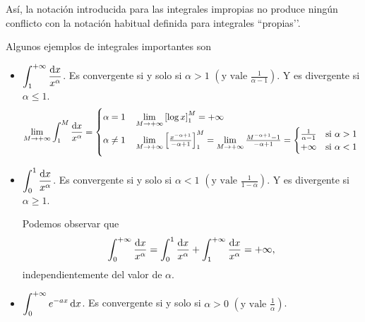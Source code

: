 \begin{obs}
    Así, la notación introducida para las integrales impropias no produce ningún
    conflicto con la notación habitual definida para integrales ``propias’’.
\end{obs}

\begin{example}
    Algunos ejemplos de integrales importantes son
    \begin{itemize}
        \item $\displaystyle \int^{+\infty}_1 \frac{\dif x}{x^\alpha}$. Es
            convergente si y solo si $\alpha > 1$ $\left(\text{y vale }
            \frac{1}{\alpha-1}\right)$. Y es divergente si $\alpha \leq 1$.
            \[
                \lim_{M \to +\infty} \int^M_1 \frac{\dif x}{x^\alpha} =
                \begin{cases}
                    \alpha = 1 \quad \lim\limits_{M \to +\infty}
                    \left[\log x \right]^M_1 = + \infty \\
                    \alpha \neq 1 \quad \lim\limits_{M \to +\infty}
                    \left[\frac{x^{-\alpha+1}}{-\alpha+1}
                    \right]^M_1 = \lim\limits_{M \to +\infty}
                    \frac{M^{-\alpha+1}-1}{-\alpha+1}=\begin{cases}
                        \frac{1}{\alpha-1} \quad
                        \text{si $\alpha > 1$} \\
                        +\infty \quad \text{si $\alpha < 1$}
                    \end{cases}
                \end{cases}
            \]
        \item $\displaystyle \int^1_0 \frac{\dif x}{x^\alpha}$. Es convergente
            si y solo si $\alpha < 1$ $\left(\text{y vale } \frac{1}{1-\alpha
            }\right)$. Y es divergente si $\alpha \geq 1$.

            Podemos observar que
            \[
                \int^{+\infty}_0 \frac{\dif x}{x^\alpha} = \int^1_0
                \frac{\dif x}{x^\alpha} + \int^{+\infty}_1
                \frac{\dif x}{x^\alpha} = +\infty,
            \]
            independientemente del valor de $\alpha$.
        \item $\displaystyle  \int^{+\infty}_0 e^{-ax} \dif x$. Es convergente
            si y solo si $\alpha > 0$ $\left(\text{y vale }\frac{1}{\alpha}\right)$.
    \end{itemize}
\end{example}

